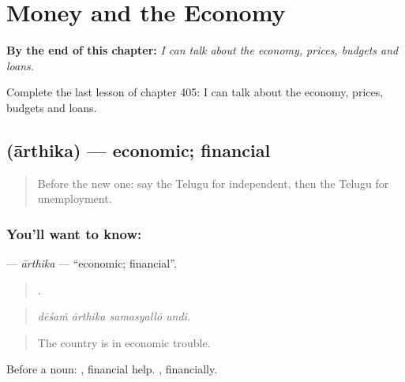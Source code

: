 
\chapter{Money and the Economy}
\label{ch:te-money-and-the-economy}

\begin{chapteropening}
\textbf{By the end of this chapter:} \emph{I can talk about the economy, prices, budgets and loans.}

Complete the last lesson of chapter 405: I can talk about the economy, prices, budgets and loans.
\end{chapteropening}

\section[\texorpdfstring{\te{ఆర్థిక} (ārthika)}{ఆర్థిక (ārthika)}]{ (ārthika) — economic; financial}

\label{lesson:TE-C405-arthika}



\begin{quote}
Before the new one: say the Telugu for independent, then the Telugu for unemployment.
\end{quote}

\subsection*{You'll want to know: }
\textbf{} — \emph{ārthika} — \textquotedblleft{}economic; financial\textquotedblright{}.

\begin{quote}
   .
\end{quote}

\begin{quote}
\emph{dēśaṁ ārthika samasyallō undi.}
\end{quote}

\begin{quote}
The country is in economic trouble.
\end{quote}

Before a noun:  , financial help. , financially.

